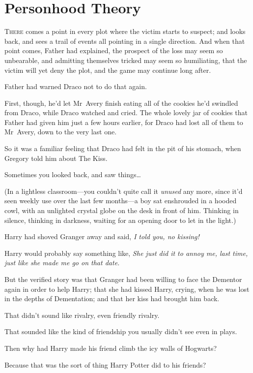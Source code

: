 \chapter{Personhood Theory}

\lettrine{T}{here} comes a point in every plot where the victim starts to suspect; and looks back, and sees a trail of events all pointing in a single direction. And when that point comes, Father had explained, the prospect of the loss may seem so unbearable, and admitting themselves tricked may seem so humiliating, that the victim will yet deny the plot, and the game may continue long after.

Father had warned Draco not to do that again.

First, though, he’d let Mr~Avery finish eating all of the cookies he’d swindled from Draco, while Draco watched and cried. The whole lovely jar of cookies that Father had given him just a few hours earlier, for Draco had lost all of them to Mr~Avery, down to the very last one.

So it was a familiar feeling that Draco had felt in the pit of his stomach, when Gregory told him about The Kiss.

Sometimes you looked back, and saw things…

(In a lightless classroom—you couldn’t quite call it \emph{unused} any more, since it’d seen weekly use over the last few months—a boy sat enshrouded in a hooded cowl, with an unlighted crystal globe on the desk in front of him. Thinking in silence, thinking in darkness, waiting for an opening door to let in the light.)

Harry had shoved Granger away and said, \emph{I told you, no kissing!}

Harry would probably say something like, \emph{She just did it to annoy me, last time, just like she made me go on that date.}

But the verified story was that Granger had been willing to face the Dementor again in order to help Harry; that she had kissed Harry, crying, when he was lost in the depths of Dementation; and that her kiss had brought him back.

That didn’t sound like rivalry, even friendly rivalry.

That sounded like the kind of friendship you usually didn’t see even in plays.

Then why had Harry made his friend climb the icy walls of Hogwarts?

Because that was the sort of thing Harry Potter did to his friends?

